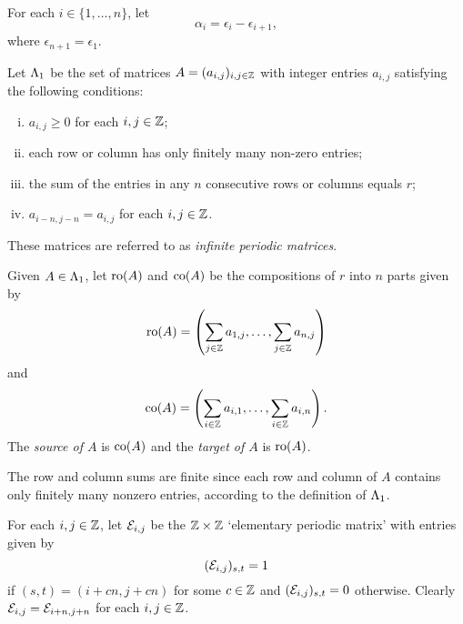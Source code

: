 \documentclass[a4paper, 11pt]{report}
\begin{document}
For each $i\in\{1,\ldots,n\}$, let
\begin{equation*}
\alpha_i = \epsilon_i - \epsilon_{i+1},
\end{equation*}
where $\epsilon_{n+1}=\epsilon_1$.

\begin{definition}\label{def:matrices}
Let $\Lambda_1{}$ be the set of matrices $A=(a_{i,j})_{i,j\in\mathbb{Z}}$ with integer entries $a_{i,j}$ satisfying the following conditions: 
\begin{enumerate}[i.]
\item
$a_{i,j}\geq 0$ for each $i,j\in\mathbb{Z}$;
\item
each row or column has only finitely many non-zero entries;
\item
the sum of the entries in any $n$ consecutive rows or columns equals $r$;
\item
$a_{i-n,j-n}=a_{i,j}$ for each $i,j\in\mathbb{Z}$.
\end{enumerate}
These matrices are referred to as \emph{infinite periodic matrices}.
\end{definition}

\begin{definition}\label{def:source-target}
Given $A\in\Lambda_1{}$, let $\operatorname{ro}(A)$ and $\operatorname{co}(A)$ be the compositions of $r$ into $n$ parts given by
\begin{equation*}
\operatorname{ro}(A) = \left( \sum_{j\in\mathbb{Z}}a_{1,j}, \ldots, \sum_{j\in\mathbb{Z}} a_{n,j}\right)
\end{equation*}
and
\begin{equation*}
\operatorname{co}(A) = \left( \sum_{i\in\mathbb{Z}} a_{i,1}, \ldots, \sum_{i\in\mathbb{Z}} a_{i,n}\right).
\end{equation*}
The \emph{source of $A$} is $\operatorname{co}(A)$ and the \emph{target of $A$} is $\operatorname{ro}(A)$.
\end{definition}

The row and column sums are finite since each row and column of $A$ contains only finitely many nonzero entries, according to the definition of $\Lambda_1{}$.

	For each $i,j\in\mathbb{Z}$, let $\mathcal{E}_{i,j}$ be the $\mathbb{Z}\times\mathbb{Z}$ `elementary periodic matrix' with entries given by
\begin{equation*}
(\mathcal{E}_{i,j})_{s,t}=1
\end{equation*}
if $(s,t) = (i+cn,j+cn)$ for some $c\in\mathbb{Z}$ and $(\mathcal{E}_{i,j})_{s,t}=0$ otherwise. Clearly $\mathcal{E}_{i,j} = \mathcal{E}_{i+n,j+n}$ for each $i,j\in\mathbb{Z}$.
\end{document}
